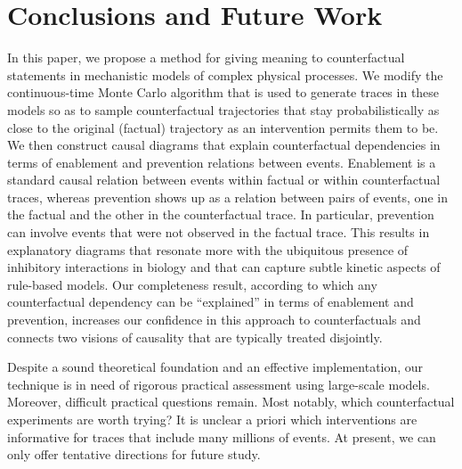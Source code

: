 
\section{Conclusions and Future Work}

In this paper, we propose a method for giving meaning to
counterfactual statements in mechanistic models of
complex physical processes.  We modify the continuous-time Monte Carlo
algorithm that is used to generate traces in these models so as to
sample counterfactual trajectories that stay probabilistically as
close to the original (factual) trajectory as an intervention permits
them to be. We then construct causal diagrams that explain
counterfactual dependencies in terms of enablement and prevention
relations between events. Enablement is a standard causal relation
between events within factual or within counterfactual traces, whereas
prevention shows up as a relation between pairs of events, one in the
factual and the other in the counterfactual trace. In particular,
prevention can involve events that were not observed in the factual
trace. This results in explanatory diagrams that resonate more with
the ubiquitous presence of inhibitory interactions in biology and that
can capture subtle kinetic aspects of rule-based models.  Our
completeness result, according to which any counterfactual dependency
can be ``explained'' in terms of enablement and prevention, increases
our confidence in this approach to counterfactuals and connects two
visions of causality that are typically treated disjointly.

Despite a sound theoretical foundation and an effective
implementation, our technique is in need of rigorous practical
assessment using large-scale models. Moreover, difficult practical
questions remain. Most notably, which counterfactual experiments are
worth trying? It is unclear a priori which interventions are
informative for traces that include many millions of events. At
present, we can only offer tentative directions for future study.

